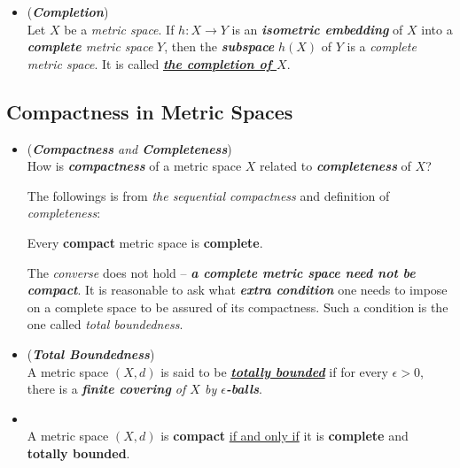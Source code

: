 \documentclass[11pt]{article}
\begin{document}
\begin{itemize}
\item \begin{definition} (\emph{\textbf{Completion}})\\
Let $X$ be a \emph{metric space}. If $h : X \rightarrow Y$ is an \textbf{\emph{isometric embedding}} of $X$ into a \emph{\textbf{complete} metric space} $Y$, then the \emph{\textbf{subspace}} $h(X)$ of $Y$ is a \emph{complete metric space}. It is called \underline{\emph{\textbf{the completion of $X$}}}.
\end{definition}
\end{itemize}

\subsection{Compactness in Metric Spaces}
\begin{itemize}
\item \begin{remark} (\emph{\textbf{Compactness} and \textbf{Completeness}})\\
How is \emph{\textbf{compactness}} of a metric space $X$ related to \emph{\textbf{completeness}} of $X$? 

The followings is from \emph{the sequential compactness} and definition of \emph{completeness}:
\begin{proposition}
Every \textbf{compact} metric space is \textbf{complete}.
\end{proposition}
The \emph{converse} does not hold -- \emph{\textbf{a complete metric space need not be compact}}. It is reasonable to ask what \emph{\textbf{extra condition}} one needs to impose on a complete space to be assured of its compactness.
Such a condition is the one called \emph{total boundedness}.
\end{remark}

\item \begin{definition} (\emph{\textbf{Total Boundedness}})\\
A metric space $(X, d)$ is said to be \underline{\emph{\textbf{totally bounded}}} if for every $\epsilon > 0$, there is a \emph{\textbf{finite covering} of $X$ by \textbf{$\epsilon$-balls}}.
\end{definition}

\item \begin{theorem} \citep{munkres2000topology}\\
A metric space $(X, d)$ is \textbf{compact} \underline{if and only if} it is \textbf{complete} and \textbf{totally bounded}.
\end{theorem}


\end{itemize}
\end{document}
